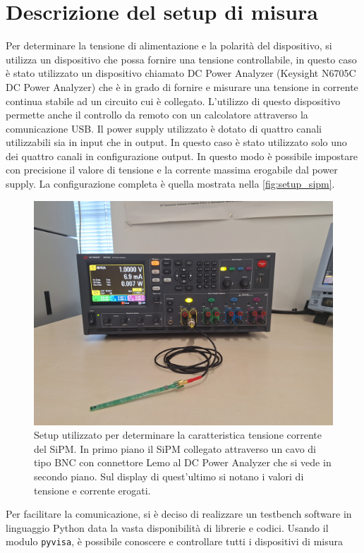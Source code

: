 \section{Descrizione del setup di misura}\label{descrizione_setup}
Per determinare la tensione di alimentazione e la polarità del dispositivo, si utilizza un dispositivo che possa fornire una tensione 
controllabile, in questo caso è stato utilizzato un dispositivo chiamato DC Power Analyzer (Keysight N6705C DC Power Analyzer) che è in grado di 
fornire e misurare una tensione in corrente continua stabile ad un circuito cui è collegato. L'utilizzo di questo dispositivo permette anche il 
controllo da remoto con un calcolatore attraverso la comunicazione USB.
 Il power supply utilizzato è dotato di quattro canali utilizzabili sia in input che in output. In questo caso è 
stato utilizzato solo uno dei quattro canali in configurazione output. In questo modo è possibile impostare con precisione il valore di tensione e 
la corrente massima erogabile dal power supply. La configurazione completa è quella mostrata nella \autoref*{fig:setup_sipm}.
\begin{figure}[h!]
    \centering
    \includegraphics[width=.75\linewidth]{img/setup_sipm.jpg}
    \caption{Setup utilizzato per determinare la caratteristica tensione corrente del SiPM. In primo piano il SiPM collegato attraverso un cavo di 
    tipo BNC con connettore Lemo al DC Power Analyzer che si vede in secondo piano. Sul display di quest'ultimo si notano i valori di tensione e 
    corrente erogati.}
    \label{fig:setup_sipm}
\end{figure}
 Per facilitare la comunicazione, si è deciso di realizzare un testbench software in linguaggio Python data la vasta 
disponibilità di librerie e codici. Usando il modulo \texttt{pyvisa}, è possibile conoscere e controllare tutti i dispositivi di misura
